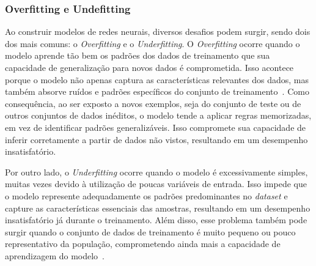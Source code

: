         \subsubsection{Overfitting e Undefitting}
            Ao construir modelos de redes neurais, diversos desafios podem surgir, sendo dois dos mais comuns: o 
            \emph{Overfitting} e o \emph{Underfitting}. O \emph{Overfitting} ocorre quando o modelo aprende tão 
            bem os padrões dos dados de treinamento que sua capacidade de generalização para novos dados é 
            comprometida. Isso acontece porque o modelo não apenas captura as características relevantes dos dados, 
            mas também absorve ruídos e padrões específicos do conjunto de treinamento~\cite{montesinos2022}. 
            Como consequência, ao ser exposto a novos exemplos, seja do conjunto de teste ou de outros conjuntos de 
            dados inéditos, o modelo tende a aplicar regras memorizadas, em vez de identificar padrões generalizáveis. 
            Isso compromete sua capacidade de inferir corretamente a partir de dados não vistos, resultando em um 
            desempenho insatisfatório.

            Por outro lado, o \emph{Underfitting} ocorre quando o modelo é excessivamente simples, muitas vezes 
            devido à utilização de poucas variáveis de entrada. Isso impede que o modelo represente adequadamente 
            os padrões predominantes no \emph{dataset} e capture as características essenciais das amostras, 
            resultando em um desempenho insatisfatório já durante o treinamento. Além disso, esse problema também 
            pode surgir quando o conjunto de dados de treinamento é muito pequeno ou pouco representativo da 
            população, comprometendo ainda mais a capacidade de aprendizagem do modelo~\cite{montesinos2022}.
            
        

